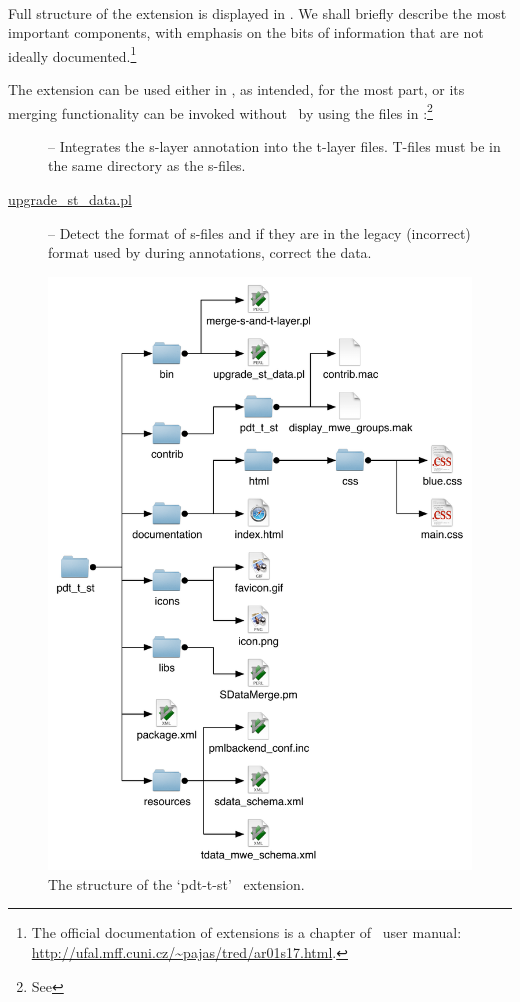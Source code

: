 \todo\ 

Full structure of the extension is displayed in . We shall briefly describe the most important components, with emphasis on the bits of information that are not ideally documented.\footnote{The official documentation of extensions is a chapter of \tred\ user manual: \url{http://ufal.mff.cuni.cz/~pajas/tred/ar01s17.html}.}

The extension can be used either in \tred, as intended, for the most part, or its merging functionality can be invoked without \tred\ by using the files in :\footnote{See }
\begin{description}
\item [] -- Integrates the s-layer annotation into the t-layer files. T-files must be in the same directory as the s-files. 
\item [\url{upgrade_st_data.pl}] -- Detect the format of s-files and if they are in the legacy (incorrect) format used by \seman during annotations, correct the data. 
\end{description}






\begin{figure}[htbp]
   \centering
   \includegraphics[width=\textwidth]{images/extension-structure} 
   \caption{The structure of the `pdt-t-st' \tred\ extension.}
   \label{fig:tred-ext}
\end{figure}